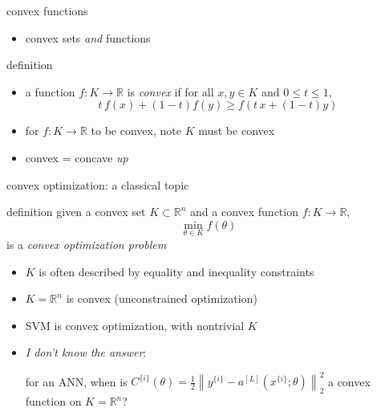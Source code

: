 \documentclass[xcolor={svgnames},
               hyperref={colorlinks,citecolor=DeepPink4,linkcolor=FireBrick,urlcolor=Maroon}]
               {beamer}
\newcommand{\RR}{\mathbb{R}}
\begin{document}
\begin{frame}{convex functions}

\begin{itemize}
\item convex sets \emph{and} functions
\end{itemize}

\begin{block}{definition}
\begin{itemize}
\item a function $f:K \to \RR$ is \emph{convex} if for all $x,y \in K$ and $0 \le t \le 1$,
  $$t\, f(x) + (1-t) f(y) \ge f(t\, x + (1-t) y)$$
\end{itemize}
\end{block}

\begin{itemize}
\item for $f:K\to \RR$ to be convex, note $K$ must be convex
\item convex = concave \emph{up}
\end{itemize}
\end{frame}


\begin{frame}{convex optimization: a classical topic}

\begin{block}{definition}
given a convex set $K \subset \RR^n$ and a convex function $f:K\to \RR$,
    $$\min_{\theta \in K} f(\theta)$$
is a \emph{convex optimization problem}
\end{block}

\begin{itemize}
\item $K$ is often described by equality and inequality constraints
\item $K=\RR^n$ is convex (unconstrained optimization)
\item SVM is convex optimization, with nontrivial $K$
\item \emph{I don't know the answer}:

for an ANN, when is $C^{\{i\}}(\theta) = \frac{1}{2} \left\|y^{\{i\}} - a^{[L]}(x^{\{i\}}; \theta)\right\|_2^2$ a convex function on $K = \RR^n$?
\end{itemize}
\end{frame}
\end{document}
